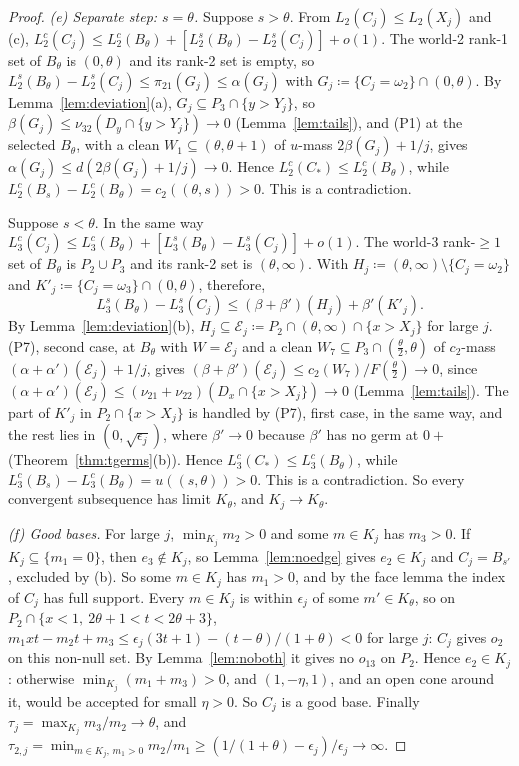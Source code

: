 \documentclass[11pt]{article}
\theoremstyle{definition}\newtheorem{definition}[theorem]{Definition}
\theoremstyle{remark}\newtheorem{remark}[theorem]{Remark}
\begin{document}
\begin{proof}
\emph{(e) Separate step: $s=\theta$.} Suppose $s>\theta$. From
$L_2(C_j)\le L_2(X_j)$ and (c),
$L_2^c(C_j)\le L_2^c(B_\theta)+[L_2^s(B_\theta)-L_2^s(C_j)]+o(1)$. The
world-2 rank-1 set of $B_\theta$ is $(0,\theta)$ and its rank-2 set is empty,
so $L_2^s(B_\theta)-L_2^s(C_j)\le\pi_{21}(G_j)\le\alpha(G_j)$ with
$G_j\coloneqq\{C_j=\omega_2\}\cap(0,\theta)$. By
Lemma~\ref{lem:deviation}(a), $G_j\subseteq P_3\cap\{y>Y_j\}$, so
$\beta(G_j)\le\nu_{32}(D_y\cap\{y>Y_j\})\to0$ (Lemma~\ref{lem:tails}), and
(P1) at the selected $B_\theta$, with a clean $W_1\subseteq(\theta,\theta+1)$
of $u$-mass $2\beta(G_j)+1/j$, gives $\alpha(G_j)\le d(2\beta(G_j)+1/j)\to0$.
Hence $L_2^c(C_*)\le L_2^c(B_\theta)$, while $L_2^c(B_s)-L_2^c(B_\theta)=
c_2((\theta,s))>0$. This is a contradiction.

Suppose $s<\theta$. In the same way $L_3^c(C_j)\le L_3^c(B_\theta)+
[L_3^s(B_\theta)-L_3^s(C_j)]+o(1)$. The world-3 rank-$\ge1$ set of
$B_\theta$ is $P_2\cup P_3$ and its rank-2 set is $(\theta,\infty)$. With
$H_j\coloneqq(\theta,\infty)\setminus\{C_j=\omega_2\}$ and
$K'_j\coloneqq\{C_j=\omega_3\}\cap(0,\theta)$, therefore,
\[
 L_3^s(B_\theta)-L_3^s(C_j)\le(\beta+\beta')(H_j)+\beta'(K'_j).
\]
By Lemma~\ref{lem:deviation}(b), $H_j\subseteq\mathcal E_j\coloneqq P_2\cap(\theta,
\infty)\cap\{x>X_j\}$ for large $j$. (P7), second case, at $B_\theta$ with
$W=\mathcal E_j$ and a clean $W_7\subseteq P_3\cap(\frac\theta2,\theta)$ of $c_2$-mass
$(\alpha+\alpha')(\mathcal E_j)+1/j$, gives $(\beta+\beta')(\mathcal E_j)\le c_2(W_7)/F(\frac\theta2)
\to0$, since $(\alpha+\alpha')(\mathcal E_j)\le(\nu_{21}+\nu_{22})(D_x\cap\{x>X_j\})\to0$
(Lemma~\ref{lem:tails}). The part of $K'_j$ in $P_2\cap\{x>X_j\}$ is handled
by (P7), first case, in the same way, and the rest lies in
$(0,\sqrt{\epsilon_j})$, where $\beta'\to0$ because $\beta'$ has no germ at
$0+$ (Theorem~\ref{thm:tgerms}(b)). Hence $L_3^c(C_*)\le L_3^c(B_\theta)$,
while $L_3^c(B_s)-L_3^c(B_\theta)=u((s,\theta))>0$. This is a
contradiction. So every convergent subsequence has limit $K_\theta$, and
$K_j\to K_\theta$.

\emph{(f) Good bases.} For large $j$, $\min_{K_j}m_2>0$ and some $m\in K_j$
has $m_3>0$. If $K_j\subseteq\{m_1=0\}$, then $e_3\notin K_j$, so
Lemma~\ref{lem:noedge} gives $e_2\in K_j$ and $C_j=B_{s'}$, excluded by (b).
So some $m\in K_j$ has $m_1>0$, and by the face lemma the index of $C_j$ has
full support. Every $m\in K_j$ is within $\epsilon_j$ of some $m'\in
K_\theta$, so on $P_2\cap\{x<1,\ 2\theta+1<t<2\theta+3\}$,
$m_1xt-m_2t+m_3\le\epsilon_j(3t+1)-(t-\theta)/(1+\theta)<0$ for large $j$:
$C_j$ gives $o_2$ on this non-null set. By Lemma~\ref{lem:noboth} it gives no
$o_{13}$ on $P_2$. Hence $e_2\in K_j$: otherwise $\min_{K_j}(m_1+m_3)>0$, and
$(1,-\eta,1)$, and an open cone around it, would be accepted for small
$\eta>0$. So $C_j$ is a good base. Finally $\tau_j=\max_{K_j}m_3/m_2\to
\theta$, and $\tau_{2,j}=\min_{m\in K_j,\,m_1>0}m_2/m_1\ge
(1/(1+\theta)-\epsilon_j)/\epsilon_j\to\infty$.
\end{proof}
\end{document}
